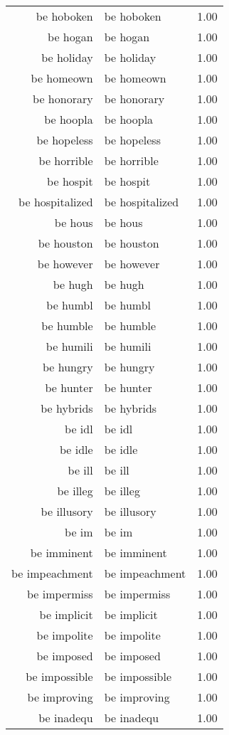 \begin{table}[ht]
\begin{tabular}{rlr}
  be hoboken & be hoboken & 1.00 \\ 
  be hogan & be hogan & 1.00 \\ 
  be holiday & be holiday & 1.00 \\ 
  be homeown & be homeown & 1.00 \\ 
  be honorary & be honorary & 1.00 \\ 
  be hoopla & be hoopla & 1.00 \\ 
  be hopeless & be hopeless & 1.00 \\ 
  be horrible & be horrible & 1.00 \\ 
  be hospit & be hospit & 1.00 \\ 
  be hospitalized & be hospitalized & 1.00 \\ 
  be hous & be hous & 1.00 \\ 
  be houston & be houston & 1.00 \\ 
  be however & be however & 1.00 \\ 
  be hugh & be hugh & 1.00 \\ 
  be humbl & be humbl & 1.00 \\ 
  be humble & be humble & 1.00 \\ 
  be humili & be humili & 1.00 \\ 
  be hungry & be hungry & 1.00 \\ 
  be hunter & be hunter & 1.00 \\ 
  be hybrids & be hybrids & 1.00 \\ 
  be idl & be idl & 1.00 \\ 
  be idle & be idle & 1.00 \\ 
  be ill & be ill & 1.00 \\ 
  be illeg & be illeg & 1.00 \\ 
  be illusory & be illusory & 1.00 \\ 
  be im & be im & 1.00 \\ 
  be imminent & be imminent & 1.00 \\ 
  be impeachment & be impeachment & 1.00 \\ 
  be impermiss & be impermiss & 1.00 \\ 
  be implicit & be implicit & 1.00 \\ 
  be impolite & be impolite & 1.00 \\ 
  be imposed & be imposed & 1.00 \\ 
  be impossible & be impossible & 1.00 \\ 
  be improving & be improving & 1.00 \\ 
  be inadequ & be inadequ & 1.00 \\ 

\end{tabular}
\end{table}
